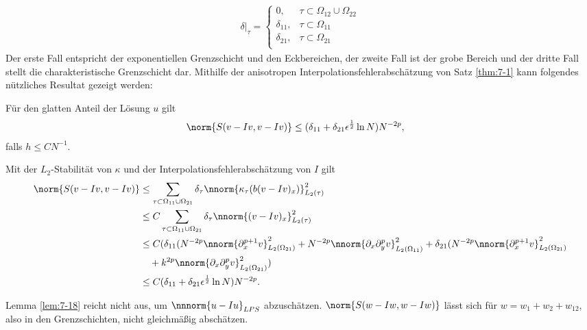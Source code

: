 \begin{align*}
  \delta|_{\tau} =
  \begin{cases}
    0, & \tau \subset \Omega_{12} \cup \Omega_{22}\\
    \delta_{11}, & \tau \subset \Omega_{11} \\
    \delta_{21}, & \tau \subset \Omega_{21} \\
  \end{cases}
\end{align*}
Der erste Fall entspricht der exponentiellen Grenzschicht und den Eckbereichen, der zweite Fall ist der grobe Bereich und der dritte Fall stellt die charakteristische Grenzschicht dar. Mithilfe der anisotropen Interpolationsfehlerabschätzung von Satz \ref{thm:7-1} kann folgendes nützliches Resultat gezeigt werden:
\begin{lemma}\label{lem:7-18}
  Für den glatten Anteil der Lösung $u$ gilt
  \begin{align*}
    \norm{S(v - Iv, v-Iv)} & \leq (\delta_{11} + \delta_{21}\epsilon^{\frac 12} \ln N)N^{-2p}, 
  \end{align*}
falls $h \leq CN^{-1}$. 
\end{lemma}
\begin{beweis}
  Mit der $L_{2}$-Stabilität von $\kappa$ und der Interpolationsfehlerabschätzung von $I$ gilt
  \begin{align*}
\norm{S(v - Iv, v-Iv)} & \leq \sum_{\tau \subset \Omega_{11} \cup \Omega_{21}} \delta_{\tau} \nnorm{\kappa_{\tau}(b(v-Iv)_{x})}_{L_{2}(\tau)}^{2}\\
& \leq C \sum_{\tau \subset \Omega_{11} \cup \Omega_{21}} \delta_{\tau} \nnorm{(v-Iv)_{x}}_{L_{2}(\tau)}^{2}\\
& \leq C (\delta_{11}(N^{-2p} \nnorm{\partial_{x}^{p+1}v}_{L_{2}(\Omega_{21})}^{2} + N^{-2p} \nnorm{\partial_{x}\partial_{y}^{p}v}^{2}_{L_{2}(\Omega_{11})}+ \delta_{21} (N^{-2p}\nnorm{\partial_{x}^{p+1}v}^{2}_{L_{2}(\Omega_{21})} \\
& \quad + k^{2p} \nnorm{\partial_{x}\partial_{y}^{p}v}^{2}_{L_{2}(\Omega_{21})})\\
& \leq C (\delta_{11} + \delta_{21}\epsilon^{\frac 12} \ln N)N^{-2p}. 
  \end{align*}
\end{beweis}

Lemma \ref{lem:7-18} reicht nicht aus, um $\nnnorm{u - Iu}_{LPS}$ abzuschätzen. $\norm{S(w - Iw, w- Iw)}$ lässt sich für $w = w_{1} + w_{2} + w_{12}$, also in den Grenzschichten, nicht gleichmäßig abschätzen. 

